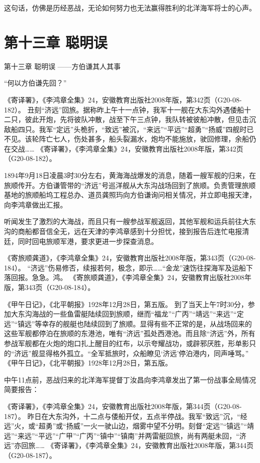\documentclass[12pt,UTF8]{ctexbook}
\begin{document}
这句话，仿佛是历经恶战，无论如何努力也无法赢得胜利的北洋海军将士的心声。

\chapter{第十三章 聪明误}

第十三章
聪明误
——方伯谦其人其事

“何以方伯谦先回？”

《寄译署》，《李鸿章全集》24，安徽教育出版社2008年版，第342页（G20-08-182）。
丑刻“济远”回旅。据称昨上午十一点钟，我军十一舰在大东沟外遇倭船十二只，彼此开炮，先将彼队冲散，战至下午三点钟，我队转被彼船冲散，但见击沉敌船四只。我军“定远”头桅折，“致远”被沉，“来远”“平远”“超勇”“扬威”四舰时已不见。该轮阵亡七人，伤处甚多，船头裂漏水，炮均不能施放，驶回修理，余船仍在交战…… 《寄译署》，《李鸿章全集》24，安徽教育出版社2008年版，第342页（G20-08-182）。

1894年9月18日凌晨3时30分左右，黄海海战爆发的消息，随着一艘军舰的归来，在旅顺传开。方伯谦管带的“济远”号巡洋舰从大东沟战场回到了旅顺。负责管理旅顺基地的旅顺船坞工程总办、道员龚照玙向方伯谦询问相关情况，并立即电报天津，向李鸿章做出汇报。

听闻发生了激烈的大海战，而且只有一艘参战军舰返回，其他军舰和运兵前往大东沟的商船都音信全无，远在天津的李鸿章感到十分担忧，接到报告后连忙电报清廷，同时回电旅顺军港，要求更进一步探查消息。

《寄旅顺龚道》，《李鸿章全集》24，安徽教育出版社2008年版，第343页（G20-08-184）。
“济远”伤易修否，续报若何，极念，即示……“金龙”速饬往探海军及运船下落回报。急急。鸿。 《寄旅顺龚道》，《李鸿章全集》24，安徽教育出版社2008年版，第343页（G20-08-184）。

《甲午日记》，《北平朝报》1928年12月28日，第五版。
到了当天上午7时30分，参加大东沟海战的一些鱼雷艇陆续回到旅顺，继而“福龙”“广丙”“靖远”“来远”“定远”“镇远”等幸存的舰艇也陆续回到了旅顺。显得有些不正常的是，从战场回来的这些军舰都停泊在旅顺的东港池，唯有“济远”孤处西港池。而且除“济远”外，所有参战军舰都在火炮的炮口扎上醒目的红布，以示夸耀战功，或辟邪厌胜，形单影只的“济远”舰显得格外孤立。“全军抵旅时，众船瞭见‘济远’停泊港内，同声唾骂。” 《甲午日记》，《北平朝报》1928年12月28日，第五版。

中午11点前，恶战归来的北洋海军提督丁汝昌向李鸿章发出了第一份战事全局情况简要报告：

《寄译署》，《李鸿章全集》24，安徽教育出版社2008年版，第344页（G20-08-187）。
昨日在大东沟外，十二点与倭船开仗，五点半停战。我军“致远”沉，“经远”火，或“超勇”或“扬威”一火一驶山边，烟雾中望不分明。刻督“定远”“镇远”“靖远”“来远”“平远”“广甲”“广丙”“镇中”“镇南”并两雷艇回旅，尚有两艇未回，“济远”亦回旅…… 《寄译署》，《李鸿章全集》24，安徽教育出版社2008年版，第344页（G20-08-187）。
\end{document}
